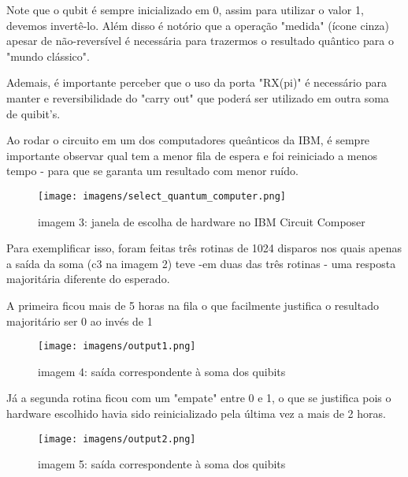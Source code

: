 \documentclass[12pt, a4paper]{article} %
\begin{document}
        Note que o qubit \'e sempre inicializado em 0, assim para utilizar o valor 1, devemos invert\^e-lo. Al\'em disso \'e not\'orio que a opera\c{c}\~ao "medida" (\'icone cinza) apesar de n\~ao-revers\'ivel \'e necess\'aria para trazermos o resultado qu\^antico para o "mundo cl\'assico".
    
        Ademais, \'e importante perceber que o uso da porta "RX(pi)" \'e necess\'ario para manter e reversibilidade do "carry out" que poder\'a ser utilizado em outra soma de quibit's.
    
        Ao rodar o circuito em um dos computadores que\^anticos da IBM, \'e sempre importante observar qual tem a menor fila de espera e foi reiniciado a menos tempo - para que se garanta um resultado com menor ru\'ido.
        
        \begin{figure}[H]
        
        \centering
        
        \texttt{[image: imagens/select\_quantum\_computer.png]}
        
        imagem 3: janela de escolha de hardware no IBM Circuit Composer
        
        \end{figure}

        Para exemplificar isso, foram feitas tr\^es rotinas de 1024 disparos nos quais apenas a saída da soma (c3 na imagem 2) teve -em duas das tr\^es rotinas - uma resposta majorit\'aria diferente do esperado.

        A primeira ficou mais de 5 horas na fila o que facilmente justifica o resultado majoritário ser 0 ao invés de 1

        \begin{figure}[H]
        
        \centering
        
        \texttt{[image: imagens/output1.png]}
        
        imagem 4: sa\'ida correspondente \`a soma dos quibits
        
        \end{figure}

        J\'a a segunda rotina ficou com um "empate" entre 0 e 1, o que se justifica pois o hardware escolhido havia sido reinicializado pela \'ultima vez a mais de 2 horas.

        \begin{figure}[H]
        
        \centering
        
        \texttt{[image: imagens/output2.png]}
        
        imagem 5: sa\'ida correspondente \`a soma dos quibits
        
        \end{figure}
\end{document}
